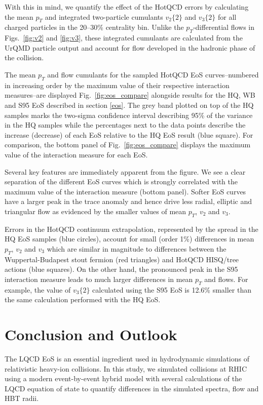 \documentclass[aps,prc,reprint,amsmath,nofootinbib,superscriptaddress]{revtex4-1}
\begin{document}
With this in mind, we quantify the effect of the HotQCD errors by calculating the mean $p_T$ and integrated two-particle cumulants $v_2\{2\}$ and $v_3\{2\}$ for all charged particles in the 20--30\% centrality bin. Unlike the $p_T$-differential flows in Figs.~\ref{fig:v2} and \ref{fig:v3}, these integrated cumulants are calculated from the UrQMD particle output and account for flow developed in the hadronic phase of the collision. 

The mean $p_T$ and flow cumulants for the sampled HotQCD EoS curves--numbered in increasing order by the maximum value of their respective interaction measures--are displayed Fig.~\ref{fig:eos_compare} alongside results for the HQ, WB and S95 EoS described in section \ref{eos}. The grey band plotted on top of the HQ samples marks the two-sigma confidence interval describing 95\% of the variance in the HQ samples while the percentages next to the data points describe the increase (decrease) of each EoS relative to the HQ EoS result (blue square). For comparison, the bottom panel of Fig.~\ref{fig:eos_compare} displays the maximum value of the interaction measure for each EoS.

Several key features are immediately apparent from the figure. We see a clear separation of the different EoS curves which is strongly correlated with the maximum value of the interaction measure (bottom panel). Softer EoS curves have a larger peak in the trace anomaly and hence drive less radial, elliptic and triangular flow as evidenced by the smaller values of 
mean $p_T$, $v_2$ and $v_3$.

Errors in the HotQCD continuum extrapolation, represented by the spread in the HQ EoS samples (blue circles), account for small (order 1\%) differences in mean $p_T$, $v_2$ and $v_3$ which are similar in magnitude to differences between the Wuppertal-Budapest stout fermion (red triangles) and HotQCD HISQ/tree actions (blue squares). On the other hand, the pronounced peak in the S95 interaction measure leads to much larger differences in mean $p_T$ and flows. For example, the value of $v_3\{2\}$ calculated using the S95 EoS is 12.6\% smaller than the same calculation performed with the HQ EoS.

\section{Conclusion and Outlook}
\label{conclusion}

The LQCD EoS is an essential ingredient used in hydrodynamic simulations of relativistic heavy-ion collisions. In this study, we simulated collisions at RHIC using a modern event-by-event hybrid model with several calculations of the LQCD equation of state to quantify differences in the simulated spectra, flow and HBT radii. 
\end{document}
